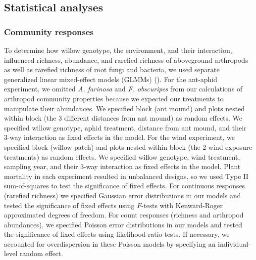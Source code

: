 \documentclass[11pt]{article}
\begin{document}
\subsection*{Statistical analyses}

\subsubsection*{Community responses}

To determine how willow genotype, the environment, and their
interaction, influenced richness, abundance, and rarefied richness of
aboveground arthropods as well as rarefied richness of root fungi and
bacteria, we used separate generalized linear mixed-effect models
(GLMMs) (\citealt{Bolker_2009}). For the ant-aphid experiment, we omitted
\emph{A. farinosa} and \emph{F. obscuripes} from our calculations of
arthropod community properties because we expected our treatments to
manipulate their abundances. We specified block (ant mound) and plots
nested within block (the 3 different distances from ant mound) as random
effects. We specified willow genotype, aphid treatment, distance from
ant mound, and their 3-way interaction as fixed effects in the model.
For the wind experiment, we specified block (willow patch) and plots
nested within block (the 2 wind exposure treatments) as random effects.
We specified willow genotype, wind treatment, sampling year, and their
3-way interaction as fixed effects in the model. Plant mortality in each
experiment resulted in unbalanced designs, so we used Type II
sum-of-squares to test the significance of fixed effects. For continuous
responses (rarefied richness) we specified Gaussian error distributions
in our models and tested the significance of fixed effects using $F$-tests
with Kenward-Roger approximated degrees of freedom. For count responses
(richness and arthropod abundances), we specified Poisson error
distributions in our models and tested the significance of fixed effects
using likelihood-ratio tests. If necessary, we accounted for
overdispersion in these Poisson models by specifying an individual-level
random effect.
\end{document}
